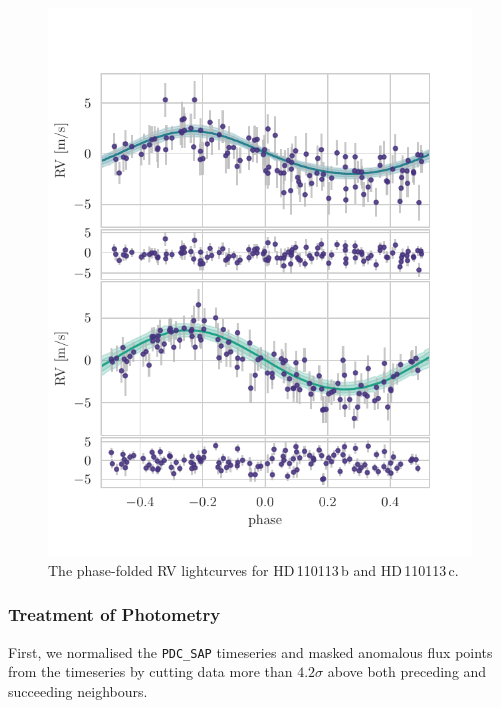 \documentclass[fleqn,usenatbib]{mnras}
\newcommand{\Tplanet}{HD\,110113\,b}
\newcommand{\Tplanetc}{HD\,110113\,c}
\begin{document}
\begin{figure}
	\includegraphics[width=\columnwidth, trim={0.1cm 0.8cm 1.0cm 0.85cm}]{Phase_folded_RV_plots_3_GPs}
    \caption{The phase-folded RV lightcurves for \Tplanet{} and \Tplanetc{}.}
    \label{fig:phase_fold_rvs}
\end{figure}

\subsubsection{Treatment of Photometry}
First, we normalised the \texttt{PDC\_SAP} timeseries and masked anomalous flux points from the timeseries by cutting data more than $4.2\sigma$ above both preceding and succeeding neighbours.
\end{document}
